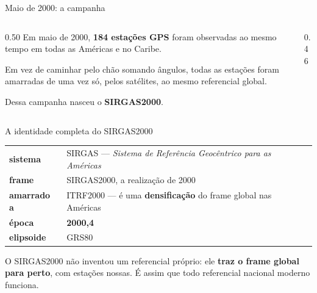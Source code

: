 \documentclass[aspectratio=169,11pt]{beamer}
\newcommand{\bnum}[1]{\textbf{\textcolor{mTeal}{#1}}}
\begin{document}
\begin{frame}{Maio de 2000: a campanha}
  \begin{columns}[T]
    \begin{column}{0.50\textwidth}
      Em maio de 2000, \bnum{184 estações GPS} foram observadas ao mesmo tempo em todas as
      Américas e no Caribe.
      \medskip

      Em vez de caminhar pelo chão somando ângulos, todas as estações foram amarradas
      \alert{de uma vez só}, pelos satélites, ao mesmo referencial global.
      \medskip

      Dessa campanha nasceu o \bnum{SIRGAS2000}.
    \end{column}
    \begin{column}{0.46\textwidth}
      \centering
    \end{column}
  \end{columns}
\end{frame}

\begin{frame}{A identidade completa do SIRGAS2000}
  \centering
  \small
  \renewcommand{\arraystretch}{1.4}
  \begin{tabular}{lp{7.6cm}}
    \toprule
    \textbf{sistema} & SIRGAS --- \emph{Sistema de Referência Geocêntrico para as Américas} \\
    \textbf{frame} & SIRGAS2000, a realização de 2000 \\
    \textbf{amarrado a} & ITRF2000 --- é uma \bnum{densificação} do frame global nas
      Américas \\
    \textbf{época} & \textcolor{corTempo}{\textbf{2000,4}} \\
    \textbf{elipsoide} & GRS80 \\
    \bottomrule
  \end{tabular}
  \bigskip

  \begin{ideia}[title={Repare na linha do meio}]
    O SIRGAS2000 não inventou um referencial próprio: ele \bnum{traz o frame global para
    perto}, com estações nossas. É assim que todo referencial nacional moderno funciona.
  \end{ideia}
\end{frame}
\end{document}
